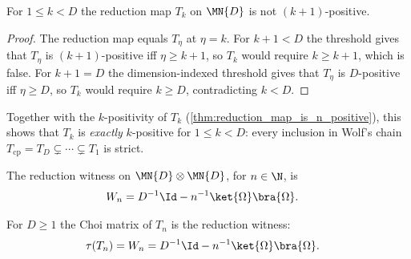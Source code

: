 \begin{theorem}
    \label{thm:reduction_map_not_n_positive_succ}
    \leanok
    For $1\le k<D$ the reduction map $T_k$ on $\MN{D}$ is not $(k+1)$-positive.
\end{theorem}

\begin{proof}
    \leanok
    The reduction map equals $T_\eta$ at $\eta=k$. For $k+1<D$ the threshold
    gives that $T_\eta$ is $(k+1)$-positive iff $\eta\ge k+1$, so $T_k$ would
    require $k\ge k+1$, which is false. For $k+1=D$ the dimension-indexed
    threshold gives that $T_\eta$ is $D$-positive iff $\eta\ge D$, so $T_k$ would
    require $k\ge D$, contradicting $k<D$.
\end{proof}

\begin{remark}
    Together with the $k$-positivity of $T_k$
    (\ref{thm:reduction_map_is_n_positive}), this shows that $T_k$ is
    \emph{exactly} $k$-positive for $1\le k<D$: every inclusion in Wolf's chain
    $T_{\mathrm{cp}}=T_D\subsetneq\cdots\subsetneq T_1$ is strict.
\end{remark}

\begin{definition}
    \label{def:reduction_witness}
    \leanok
    The reduction witness on $\MN{D}\otimes\MN{D}$, for $n\in\N$, is
    \begin{align}
        W_n & =D^{-1}\Id-n^{-1}\ket{\Omega}\bra{\Omega}.
        \notag
    \end{align}
\end{definition}

\begin{theorem}
    \label{thm:choi_matrix_reduction_witness}
    \leanok
    For $D\ge 1$ the Choi matrix of $T_n$ is the reduction witness:
    \begin{align}
        \tau(T_n) & =W_n=D^{-1}\Id-n^{-1}\ket{\Omega}\bra{\Omega}.
        \notag
    \end{align}
\end{theorem}

